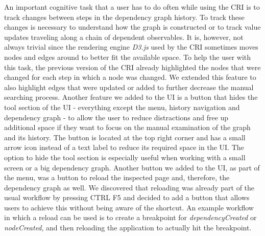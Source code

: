 An important cognitive task that a user has to do often while using the CRI is to track changes between steps in the dependency graph history. To track these changes is necessary to understand how the graph is constructed or to track value updates traveling along a chain of dependent observables. It is, however, not always trivial since the rendering engine \emph{D3.js} \cite{D3JS} used by the CRI sometimes moves nodes and edges around to better fit the available space. To help the user with this task, the previous version of the CRI already highlighted the nodes that were changed for each step in which a node was changed. We extended this feature to also highlight edges that were updated or added to further decrease the manual searching process. Another feature we added to the UI is a button that hides the tool section of the UI - everything except the menu, history navigation and dependency graph - to allow the user to reduce distractions and free up additional space if they want to focus on the manual examination of the graph and its history. The button is located at the top right corner and has a small arrow icon instead of a text label to reduce its required space in the UI. The option to hide the tool section is especially useful when working with a small screen or a big dependency graph. Another button we added to the UI, as part of the menu, was a button to reload the inspected page and, therefore, the dependency graph as well. We discovered that reloading was already part of the usual workflow by pressing CTRL F5 and decided to add a button that allows users to achieve this without being aware of the shortcut. An example workflow in which a reload can be used is to create a breakpoint for \emph{dependencyCreated} or \emph{nodeCreated}, and then reloading the application to actually hit the breakpoint.
